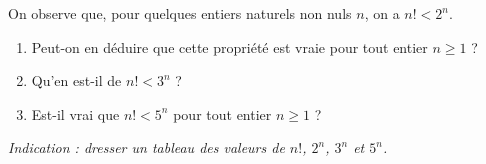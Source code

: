 On observe que, pour quelques entiers naturels non nuls $n$, on a
$n! < 2^n$.
\begin{enumerate}
  \item Peut-on en déduire que cette propriété est vraie pour tout entier
  $n \geqslant 1$ ?
  \item Qu'en est-il de $n! < 3^n$ ?
  \item Est-il vrai que $n! < 5^n$ pour tout entier $n \geqslant 1$ ?
\end{enumerate}
\emph{Indication : dresser un tableau des valeurs de $n!$, $2^n$, $3^n$ et
$5^n$.}

